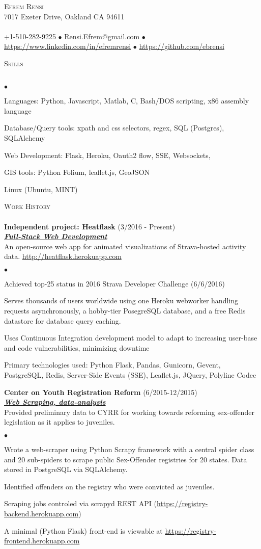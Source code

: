\documentclass{article}
\newcommand{\lineunder}{\vspace*{-8pt} \\ \hspace*{-18pt} \hrulefill \\}
\newcommand{\header}[1]{{\hspace*{-15pt}\vspace*{6pt} \textsc{#1}} \vspace*{-6pt} \lineunder}
\newcommand{\employer}[3]{{ \textbf{#1} (#2)\\ \underline{\textbf{\emph{#3}}}\\  }}
\newcommand{\contact}[3]{
\vspace*{-8pt}
\begin{center}
{\LARGE \scshape {#1}}\\
#2 \lineunder
#3
\end{center}
\vspace*{-8pt}
}
\newenvironment{achievements}{\begin{list}{$\bullet$}{\topsep 0pt \itemsep -2pt}}{\vspace*{4pt}\end{list}}
\begin{document}
\small
\smallskip
\vspace*{-44pt}

\contact{Efrem Rensi}
{7017 Exeter Drive, Oakland CA 94611}
{+1-510-282-9225 $\bullet$ Rensi.Efrem@gmail.com  $\bullet$ \url{https://www.linkedin.com/in/efremrensi}
$\bullet$ \url{https://github.com/ebrensi}
}
\smallskip

\header{Skills}
\begin{achievements}
\item Languages: Python, Javascript, Matlab, C, Bash/DOS scripting, x86 assembly language
\item Database/Query tools: xpath and css selectors, regex, SQL (Postgres), SQLAlchemy
\item Web Development: Flask, Heroku, Oauth2 flow, SSE, Websockets, 
\item GIS tools:  Python Folium, leaflet.js, GeoJSON
\item Linux (Ubuntu, MINT) 
\end{achievements}
\medskip

\header{Work History}
\employer{Independent project: Heatflask}{3/2016 - Present}{Full-Stack Web Development}
 An open-source web app for animated visualizations of Strava-hosted activity data. \url{http://heatflask.herokuapp.com}
\begin{achievements}
\item Achieved top-25 status in 2016 Strava Developer Challenge (6/6/2016) 
\item Serves thousands of users worldwide using one Heroku webworker handling requests asynchronously, a hobby-tier PosegreSQL database, and a free Redis datastore for database query caching.
\item Uses Continuous Integration development model to adapt to increasing user-base and code vulnerabilities, minimizing downtime
\item Primary technologies used: Python Flask, Pandas, Gunicorn, Gevent, PostgreSQL, Redis, Server-Side Events (SSE), Leaflet.js, JQuery,  Polyline Codec
\end{achievements}


\employer{Center on Youth Registration Reform}{6/2015-12/2015}{Web Scraping, data-analysis}
 Provided preliminary data to CYRR for working towards reforming sex-offender legislation as it applies to juveniles.
\begin{achievements}
\item Wrote a web-scraper using Python Scrapy framework with a central spider class and 20 sub-spiders to scrape public Sex-Offender registries for 20 states.  Data stored in PostgreSQL via SQLAlchemy.
\item Identified offenders on the registry who were convicted as juveniles.
\item Scraping jobs controled via scrapyd REST API (\url{https://registry-backend.herokuapp.com}) 
\item A minimal (Python Flask) front-end is viewable at \url{https://registry-frontend.herokuapp.com}
\end{achievements}
\end{document}
